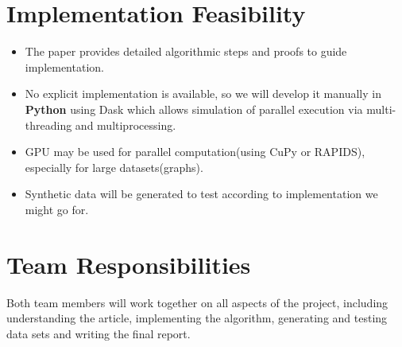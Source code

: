 \documentclass{article}
\begin{document}
\section*{Implementation Feasibility}
\begin{itemize}
    \item The paper provides detailed algorithmic steps and proofs to guide implementation.
    \item No explicit implementation is available, so we will develop it manually in \textbf{Python} using Dask which allows simulation of parallel execution via multi-threading and multiprocessing.
    \item GPU may be used for parallel computation(using CuPy or RAPIDS), especially for large datasets(graphs).
    \item Synthetic data will be generated to test according to implementation we might go for.
\end{itemize}

\section*{Team Responsibilities}
Both team members will work together on all aspects of the project, including understanding the article, implementing the algorithm, generating and testing data sets and writing the final report.
\end{document}
